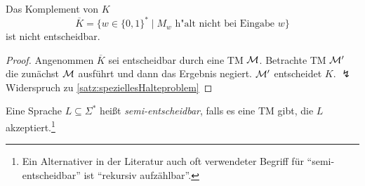 \begin{Korollar}\label{kor:6.11}
    Das Komplement von $K$
  $$\overline{K} = \{w \in\{0,1\}^* \mid M_w\text{ h"alt nicht bei Eingabe }w \}$$
  ist nicht entscheidbar.
\end{Korollar}
\begin{proof}
	Angenommen $\overline{K}$ sei entscheidbar durch eine \ac{TM} $\mathcal{M}$.
	Betrachte \ac{TM} $\mathcal{M}'$ die zunächst $\mathcal{M}$ ausführt und dann das Ergebnis negiert.
	$\mathcal{M}'$ entscheidet $K$. $\lightning$ 
	Widerspruch zu \autoref{satz:speziellesHalteproblem}
\end{proof}




\begin{Def}[name={[Semi-Entscheidbarkeit]}]
	Eine Sprache $L\subseteq\Sigma^*$ heißt \emph{semi-entscheidbar}, falls es eine \ac{TM} gibt, die $L$ akzeptiert.\footnote{
	Ein Alternativer in der Literatur auch oft verwendeter Begriff für "`semi-entscheidbar"' ist "`rekursiv aufzählbar"'.}
\end{Def}


